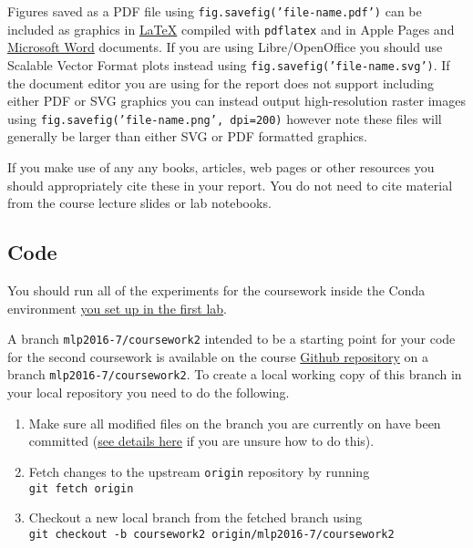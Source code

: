 \documentclass[11pt,]{article}
\begin{document}
Figures saved as a PDF file using \texttt{fig.savefig('file-name.pdf')}
can be included as graphics in
\href{https://en.wikibooks.org/wiki/LaTeX/Importing_Graphics}{LaTeX}
compiled with \texttt{pdflatex} and in Apple Pages and
\href{https://support.office.com/en-us/article/Add-a-PDF-to-your-Office-file-74819342-8f00-4ab4-bcbe-0f3df15ab0dc}{Microsoft
Word} documents. If you are using Libre/OpenOffice you should use
Scalable Vector Format plots instead using
\texttt{fig.savefig('file-name.svg')}. If the document editor you are
using for the report does not support including either PDF or SVG
graphics you can instead output high-resolution raster images using
\texttt{fig.savefig('file-name.png', dpi=200)} however note these files
will generally be larger than either SVG or PDF formatted graphics.

If you make use of any any books, articles, web pages or other resources
you should appropriately cite these in your report. You do not need to
cite material from the course lecture slides or lab notebooks.

\subsection{Code}\label{code}

You should run all of the experiments for the coursework inside the
Conda environment
\href{https://github.com/CSTR-Edinburgh/mlpractical/blob/mlp2016-7/master/environment-set-up.md}{you
set up in the first lab}.

A branch \texttt{mlp2016-7/coursework2} intended to be a starting point
for your code for the second coursework is available on the course
\href{https://github.com/CSTR-Edinburgh/mlpractical/}{Github repository}
on a branch \texttt{mlp2016-7/coursework2}. To create a local working
copy of this branch in your local repository you need to do the
following.

\begin{enumerate}
\def\labelenumi{\arabic{enumi}.}
\itemsep1pt\parskip0pt
\item
  Make sure all modified files on the branch you are currently on have
  been committed
  (\href{https://github.com/CSTR-Edinburgh/mlpractical/blob/mlp2016-7/master/getting-started-in-a-lab.md}{see
  details here} if you are unsure how to do this).
\item
  Fetch changes to the upstream \texttt{origin} repository by running\\
  \texttt{git fetch origin}
\item
  Checkout a new local branch from the fetched branch using\\
  \texttt{git checkout -b coursework2 origin/mlp2016-7/coursework2}
\end{enumerate}
\end{document}
